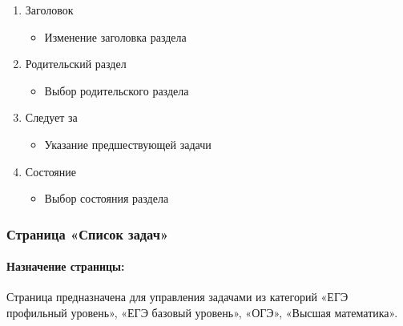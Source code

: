 \begin{enumerate}
\begin{enumerate}
\begin{enumerate}
			\item Заголовок
			\begin{itemize}
				\item Изменение заголовка раздела
			\end{itemize}

			\item Родительский раздел
			\begin{itemize}
				\item Выбор родительского раздела
			\end{itemize}

			\item Следует за
			\begin{itemize}
				\item Указание предшествующей задачи
			\end{itemize}

			\item Состояние
			\begin{itemize}
				\item Выбор состояния раздела
			\end{itemize}

		\end{enumerate}
	\end{enumerate}
\end{enumerate}

\subsubsection{Страница «Список задач»}
\paragraph{Назначение страницы:} Страница предназначена для управления задачами из категорий «ЕГЭ профильный уровень», «ЕГЭ базовый уровень», «ОГЭ», «Высшая математика».

